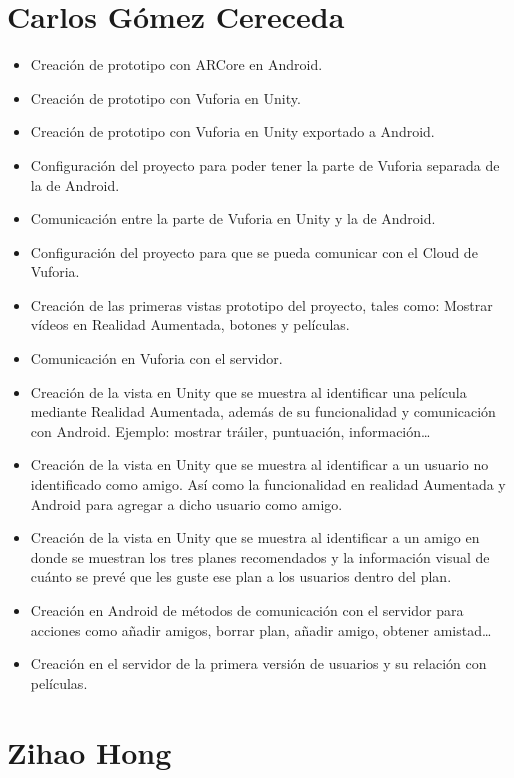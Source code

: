 \section{Carlos Gómez Cereceda}
\label{makereference7.3}
\begin{itemize}  
    \item Creación de prototipo con ARCore en Android.
    \item Creación de prototipo con Vuforia en Unity.
    \item Creación de prototipo con Vuforia en Unity exportado a Android.
    \item Configuración del proyecto para poder tener la parte de Vuforia separada de la de Android.
    \item Comunicación entre la parte de Vuforia en Unity y la de Android.
    \item Configuración del proyecto para que se pueda comunicar con el Cloud de Vuforia.
    \item Creación de las primeras vistas prototipo del proyecto, tales como: Mostrar vídeos en Realidad Aumentada, botones y películas.
    \item Comunicación en Vuforia con el servidor.
    \item Creación de la vista en Unity que se muestra al identificar una película mediante Realidad Aumentada, además de su funcionalidad y comunicación con Android. Ejemplo: mostrar tráiler, puntuación, información…
    \item Creación de la vista en Unity que se muestra al identificar a un usuario no identificado como amigo. Así como la funcionalidad en realidad Aumentada y Android para agregar a dicho usuario como amigo.
    \item Creación de la vista en Unity que se muestra al identificar a un amigo en donde se muestran los tres planes recomendados y la información visual de cuánto se prevé que les guste ese plan a los usuarios dentro del plan.
    \item Creación en Android de métodos de comunicación con el servidor para acciones como añadir amigos, borrar plan, añadir amigo, obtener amistad…
    \item Creación en el servidor de la primera versión de usuarios y su relación con películas.
\end{itemize}
\section{Zihao Hong}
\label{makereference7.4}